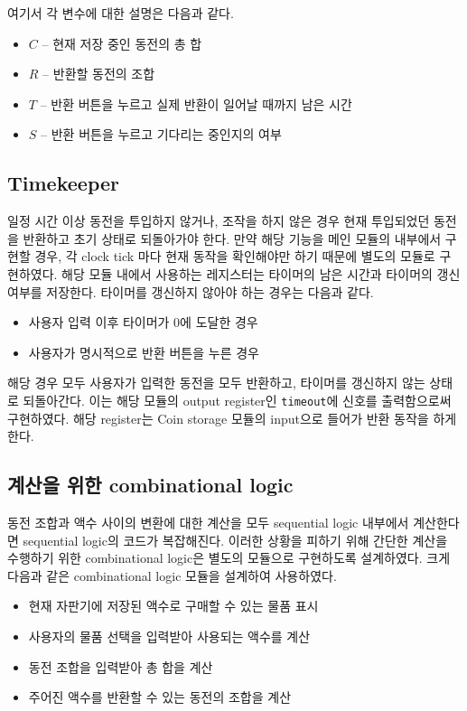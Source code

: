 \documentclass{scrartcl}
\begin{document}
여기서 각 변수에 대한 설명은 다음과 같다.

\begin{itemize}
  \item \(C\) -- 현재 저장 중인 동전의 총 합
  \item \(R\) -- 반환할 동전의 조합
  \item \(T\) -- 반환 버튼을 누르고 실제 반환이 일어날 때까지 남은 시간
  \item \(S\) -- 반환 버튼을 누르고 기다리는 중인지의 여부
\end{itemize}

\subsection{Timekeeper}
일정 시간 이상 동전을 투입하지 않거나, 조작을 하지 않은 경우 현재 투입되었던 동전을 반환하고 초기 상태로 되돌아가야 한다.
만약 해당 기능을 메인 모듈의 내부에서 구현할 경우, 각 clock tick 마다 현재 동작을 확인해야만 하기 때문에 별도의 모듈로
구현하였다.
해당 모듈 내에서 사용하는 레지스터는 타이머의 남은 시간과 타이머의 갱신 여부를 저장한다. 타이머를 갱신하지 않아야 하는 경우는
다음과 같다.

\begin{itemize}
  \item 사용자 입력 이후 타이머가 0에 도달한 경우
  \item 사용자가 명시적으로 반환 버튼을 누른 경우
\end{itemize}

해당 경우 모두 사용자가 입력한 동전을 모두 반환하고, 타이머를 갱신하지 않는 상태로 되돌아간다. 이는 해당 모듈의
output register인 \texttt{timeout}에 신호를 출력함으로써 구현하였다. 해당 register는 Coin storage 모듈의 input으로
들어가 반환 동작을 하게 한다.

\subsection{계산을 위한 combinational logic}
동전 조합과 액수 사이의 변환에 대한 계산을 모두 sequential logic 내부에서 계산한다면 sequential logic의 코드가
복잡해진다. 이러한 상황을 피하기 위해 간단한 계산을 수행하기 위한 combinational logic은 별도의 모듈으로 구현하도록
설계하였다. 크게 다음과 같은 combinational logic 모듈을 설계하여 사용하였다.

\begin{itemize}
  \item 현재 자판기에 저장된 액수로 구매할 수 있는 물품 표시
  \item 사용자의 물품 선택을 입력받아 사용되는 액수를 계산
  \item 동전 조합을 입력받아 총 합을 계산
  \item 주어진 액수를 반환할 수 있는 동전의 조합을 계산
\end{itemize}
\end{document}
